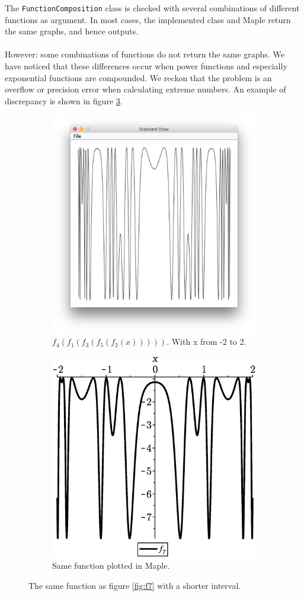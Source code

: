 The \texttt{FunctionComposition} class is checked with several combinations of different functions as argument. In most cases, the implemented class and Maple return the same graphs, and hence outputs.\\
\\
However: some combinations of functions do not return the same graphs. We have noticed that these differences occur when power functions and especially exponential functions are compounded. We reckon that the problem is an overflow or precision error when calculating extreme numbers. An example of discrepancy is shown in figure \ref{fig:disc}.

\begin{figure}[H]
    \begin{subfigure}{0.5\textwidth}
        \centering
        \includegraphics[width=0.7\linewidth]{GraphicalFunctionPlotter/fig/f7Crude.png} 
        \caption{$f_4(f_1(f_3(f_5(f_2(x)))))$. With x from -2 to 2.}
        \label{fig:f7Crude}
    \end{subfigure}
    \begin{subfigure}{0.5\textwidth}
        \centering
        \includegraphics[width=0.7\linewidth]{GraphicalFunctionPlotter/fig/f7CheckCrude.eps}
        \caption{Same function plotted in Maple.}
        \label{fig:f7CheckCrude}
    \end{subfigure}
    \caption{The same function as figure \ref{fig:f7} with a shorter interval.}
    \label{fig:disc}
\end{figure}